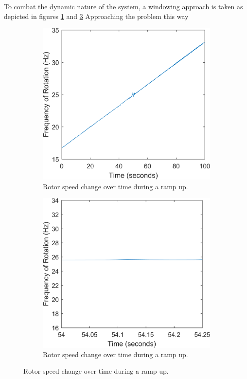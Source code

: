 To combat the dynamic nature of the system, a windowing approach is taken as depicted in figures \ref{fig:FreqSpanOverTime} and \ref{fig:FreqSpanWindow} Approaching the problem this way 
\begin{figure}
	\begin{subfigure}{.5\textwidth}
	\centering
	\includegraphics[width=\linewidth]{./figures/FrequencySpan.png}
	\caption{Rotor speed change over time during a ramp up.}
	\label{fig:FreqSpanOverTime}
\end{subfigure}
\begin{subfigure}{.5\textwidth}
	\centering
	\includegraphics[width=\linewidth]{./figures/FrequencyWindow.png}
	\caption{Rotor speed change over time during a ramp up.}
	\label{fig:FreqSpanWindow}
\end{subfigure}
\end{figure}
